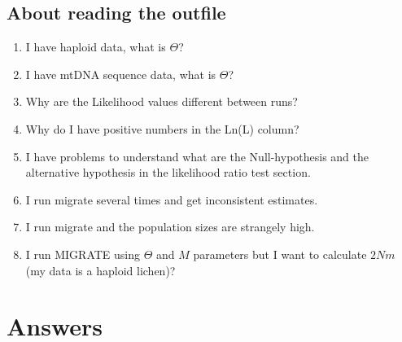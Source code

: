 \subsection{About reading the outfile}
\begin{enumerate}
\item I have haploid data, what is $\Theta$?
\item I have mtDNA sequence data, what is $\Theta$?
\item Why are the Likelihood values different between runs?
\item Why do I have positive numbers in the Ln(L) column? 
\item I have problems to understand what are the Null-hypothesis and the alternative hypothesis in the likelihood ratio test section.
\item I run migrate several times and get inconsistent estimates.
\item I run migrate and the population sizes are strangely high.
\item I run MIGRATE using $\Theta$ and $M$ parameters but I want to calculate $2Nm$ (my data is a haploid lichen)?
\end{enumerate}

\section{Answers}
